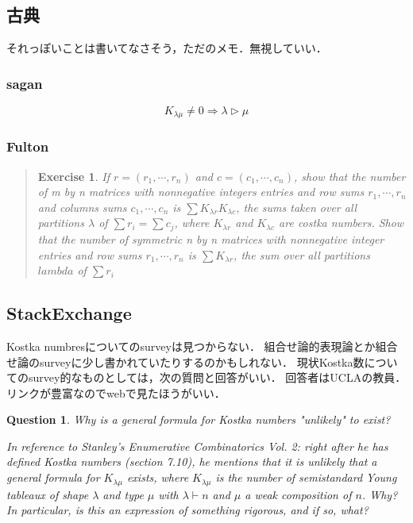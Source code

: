 \documentclass{ujarticle}[12pt,a4pepar]
\theoremstyle{jplain}
\newtheorem*{exe*}{Exercise}
\newtheorem*{q*}{Question}
\begin{document}
\subsection{古典}
それっぽいことは書いてなさそう，ただのメモ．無視していい．
\subsubsection{sagan}
\[
  K_{\lambda \mu} \neq 0 \Rightarrow \lambda \triangleright \mu
\]

\subsubsection{Fulton}

\begin{quotation}
  \begin{exe*}
    If $r = (r_1, \cdots, r_n)$ and $c = (c_1, \cdots, c_n)$, show that the number of
    m by n matrices with nonnegative integers entries and row sums $r_1, \cdots, r_n$
    and columns sums $c_1, \cdots, c_n$ is $\sum K_{\lambda r} K_{\lambda c}$, the sums
    taken over all partitions $\lambda$ of $\sum r_i = \sum c_j$, where $K_{\lambda r}$
    and $K_{\lambda c}$ are costka numbers.
    Show that the number of symmetric n by n matrices with nonnegative integer entries
    and row sums $r_1, \cdots, r_n$ is $\sum K_{\lambda r}$, the sum over all partitions
    $lambda$ of $\sum r_i$
  \end{exe*}
\end{quotation}

\subsection{StackExchange}
Kostka numbresについてのsurveyは見つからない．
組合せ論的表現論とか組合せ論のsurveyに少し書かれていたりするのかもしれない．
現状Kostka数についてのsurvey的なものとしては，次の質問と回答がいい．
回答者はUCLAの教員．リンクが豊富なのでwebで見たほうがいい．
\begin{q*}
  Why is a general formula for Kostka numbers "unlikely" to exist?

  In reference to Stanley's Enumerative Combinatorics Vol. 2: right after he has
  defined Kostka numbers (section 7.10), he mentions that it is unlikely that a
  general formula for $K_{\lambda \mu}$ exists, where $K_{\lambda \mu}$ is the
  number of semistandard Young tableaux of shape $\lambda$ and type $\mu$ with
  $\lambda \vdash n$ and $\mu$ a weak composition of $n$.
  Why? In particular, is this an expression of something rigorous, and if so, what?
\end{q*}
\end{document}
